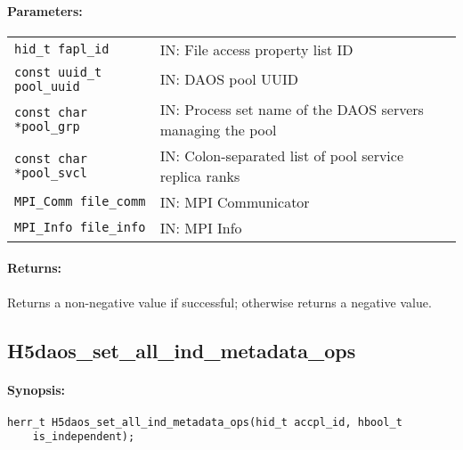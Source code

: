 \documentclass[../users_guide.tex]{subfiles}
\begin{document}
\paragraph{Parameters:}
\begin{flushleft}%
 \begin{tabular}{ll}%
   \texttt{hid\_t fapl\_id} & IN: File access property list ID \\
   \texttt{const uuid\_t pool\_uuid} & IN: DAOS pool UUID \\
   \texttt{const char *pool\_grp} & IN: Process set name of the DAOS servers managing the pool \\
   \texttt{const char *pool\_svcl} & IN: Colon-separated list of pool service replica ranks \\
   \texttt{MPI\_Comm file\_comm} & IN: MPI Communicator \\
   \texttt{MPI\_Info file\_info} & IN: MPI Info \\
 \end{tabular}%
\end{flushleft}%

\paragraph{Returns:}
\begin{flushleft}%
Returns a non-negative value if successful; otherwise returns a negative value.
\end{flushleft}%

\newpage
\subsection{H5daos\_set\_all\_ind\_metadata\_ops}
\label{ref:h5daos_set_all_ind_metadata_ops}

\paragraph{Synopsis:}
\begin{flushleft}%
\begin{verbatim}
herr_t H5daos_set_all_ind_metadata_ops(hid_t accpl_id, hbool_t
    is_independent);
\end{verbatim}
\end{flushleft}%
\end{document}
